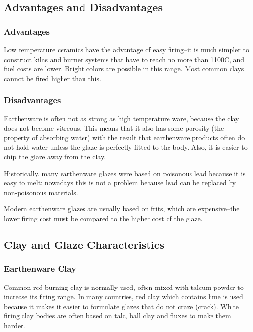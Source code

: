 \subsection{Advantages and Disadvantages}
\subsubsection{Advantages}
Low temperature ceramics have the advantage of easy firing--it is much simpler 
to construct kilns and burner systems that have to reach no more than 
1100\degree C, and fuel costs are lower. Bright colors are possible in this 
range. Most common clays cannot be fired higher than this.
\subsubsection{Disadvantages}
Earthenware is often not as strong as high temperature ware, because the clay 
does not become vitreous. This means that it also has some porosity (the 
property of absorbing water) with the result that earthenware products often do 
not hold water unless the glaze is perfectly fitted to the body. Also, it is 
easier to chip the glaze away from the clay.

Historically, many earthenware glazes were based on poisonous lead because it 
is easy to melt: nowadays this is not a problem because lead can be replaced by 
non-poisonous materials.

Modern earthenware glazes are usually based on frits, which are expensive--the 
lower firing cost must be compared to the higher cost of the glaze.
\subsection{Clay and Glaze Characteristics}
\subsubsection{Earthenware Clay}
Common red-burning clay is normally used, often mixed with talcum powder to 
increase its firing range. In many countries, red clay which contains lime is 
used because it makes it easier to formulate glazes that do not craze (crack). 
White firing clay bodies are often based on talc, ball clay and fluxes to make 
them harder.
